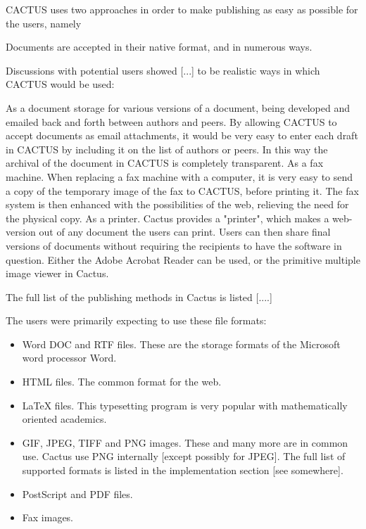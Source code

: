 CACTUS uses two approaches in order to make publishing as easy as
possible for the users, namely

\begin{center}
  Documents are accepted in their native format, and in numerous ways.
\end{center}

Discussions with potential users showed [...] to be realistic ways in
which CACTUS would be used:

As a document storage for various versions of a document, being
developed and emailed back and forth between authors and peers.  By
allowing CACTUS to accept documents as email attachments, it would be
very easy to enter each draft in CACTUS by including it on the list of
authors or peers.  In this way the archival of the document in CACTUS
is completely transparent.  As a fax machine.  When replacing a fax
machine with a computer, it is very easy to send a copy of the
temporary image of the fax to CACTUS, before printing it.  The fax
system is then enhanced with the possibilities of the web, relieving
the need for the physical copy.  As a printer.  Cactus provides a
"printer", which makes a web-version out of any document the users can
print.  Users can then share final versions of documents without
requiring the recipients to have the software in question.  Either the
Adobe Acrobat Reader can be used, or the primitive multiple image
viewer in Cactus.

The full list of the publishing methods in Cactus is listed [....]

The users were primarily expecting to use these file formats:

\begin{itemize}
  
\item 
  Word DOC and RTF files.   These are the storage formats of the
  Microsoft word processor Word.  
\item 
  HTML files.  The common format for the web.
\item 
  LaTeX files.   This typesetting program is very popular with
  mathematically oriented academics.
\item 
  GIF, JPEG, TIFF and PNG images.   These and many more are in common use.  Cactus use PNG internally [except possibly for JPEG].  The full list of supported
formats is listed in the implementation section [see somewhere].
\item 
  PostScript and PDF files.
\item 
  Fax images.
\end{itemize}

